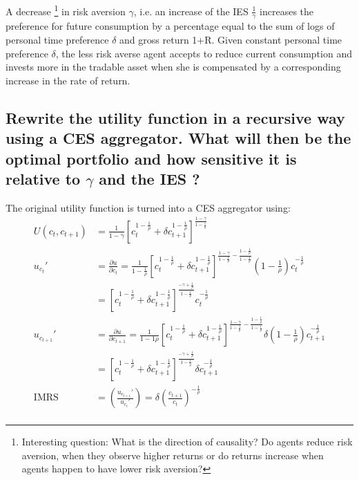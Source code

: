 \documentclass[12pt]{article}
\begin{document}
	A decrease \footnote{Interesting question: What is the direction of causality? Do agents reduce risk aversion, when they observe higher returns or do returns increase when agents happen to have lower risk aversion?} in risk aversion $\gamma$, i.e. an increase of the IES $\frac{1}{\gamma}$ increases the preference for future consumption by a percentage equal to the sum of logs of personal time preference $\delta$ and gross return 1+R. Given constant personal time preference $\delta$, the less risk averse agent accepts to reduce current consumption and invests more in the tradable asset when she is compensated by a corresponding increase in the rate of return. 
	
	\subsection{Rewrite the utility function in a recursive way using a CES aggregator. What will then be the optimal portfolio and how sensitive it is relative to $\gamma$ and the IES ?}
	The original utility function is turned into a CES aggregator using:
	\begin{align*}
		U(c_t, c_{t+1}) &= \frac{1}{1-\gamma} \left[c_t^{1-\frac{1}{\rho}} + \delta c_{t+1}^{1-\frac{1}{\rho}}\right]^{\frac{1-\gamma}{1-\frac{1}{\rho}}}\\
		u_{c_t}' &= \frac{\partial u}{\partial c_t} = \frac{1}{1-\frac{1}{\rho}}\left[c_t^{1-\frac{1}{\rho}} + \delta c_{t+1}^{1-\frac{1}{\rho}}\right]^{\frac{1-\gamma}{1-\frac{1}{\rho}} - \frac{1-\frac{1}{\rho}}{1-\frac{1}{\rho}}} (1-\frac{1}{\rho})c_t^{-\frac{1}{\rho}}\\
		&= \left[c_t^{1-\frac{1}{\rho}} + \delta c_{t+1}^{1-\frac{1}{\rho}}\right]^{\frac{-\gamma + \frac{1}{\rho}}{1-\frac{1}{\rho}}} c_t^{-\frac{1}{\rho}}\\
		u_{c_{t+1}}' &= \frac{\partial u}{\partial c_{t+1}} = \frac{1}{1-1\rho}\left[c_t^{1-\frac{1}{\rho}} + \delta c_{t+1}^{1-\frac{1}{\rho}}\right]^{\frac{1-\gamma}{1-\frac{1}{\rho}} - \frac{1-\frac{1}{\rho}}{1-\frac{1}{\rho}}} \delta (1-\frac{1}{\rho})c_{t+1}^{-\frac{1}{\rho}}\\
		&= \left[c_t^{1-\frac{1}{\rho}} + \delta c_{t+1}^{1-\frac{1}{\rho}}\right]^{\frac{-\gamma + \frac{1}{\rho}}{1-\frac{1}{\rho}}} \delta c_{t+1}^{-\frac{1}{\rho}}\\
		\text{IMRS} &= \left( \frac{u_{c_{t+1}}'}{u_{c_t}'} \right) = \delta \left(\frac{c_{t+1}}{c_t}\right)^{-\frac{1}{\rho}}\\
	\end{align*}
	
\end{document}
